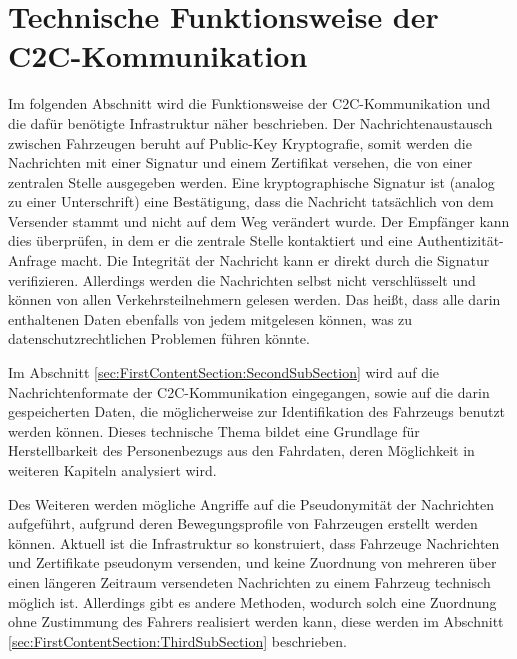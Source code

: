 
\section{Technische  Funktionsweise der C2C-Kommunikation}
\label{ch:FirstContentSection}

Im folgenden Abschnitt wird die Funktionsweise der C2C-Kommunikation und die dafür benötigte Infrastruktur näher beschrieben. Der Nachrichtenaustausch zwischen Fahrzeugen beruht auf Public-Key Kryptografie, somit werden die Nachrichten mit einer Signatur und einem Zertifikat versehen, die von einer zentralen Stelle ausgegeben werden. Eine kryptographische Signatur ist (analog zu einer Unterschrift) eine Bestätigung, dass die Nachricht tatsächlich von dem Versender stammt und nicht auf dem Weg verändert wurde. Der Empfänger kann dies überprüfen, in dem er die zentrale Stelle kontaktiert und eine Authentizität-Anfrage macht. Die Integrität der Nachricht kann er direkt durch die Signatur verifizieren. Allerdings werden die Nachrichten selbst nicht verschlüsselt und können von allen Verkehrsteilnehmern gelesen werden. Das heißt, dass alle darin enthaltenen Daten ebenfalls von jedem mitgelesen können, was zu datenschutzrechtlichen Problemen führen könnte. 

Im Abschnitt \ref{sec:FirstContentSection:SecondSubSection} wird auf die Nachrichtenformate der C2C-Kommunikation eingegangen, sowie auf die darin gespeicherten Daten, die möglicherweise zur Identifikation des Fahrzeugs benutzt werden können. Dieses technische Thema bildet eine Grundlage für Herstellbarkeit des Personenbezugs aus den Fahrdaten, deren Möglichkeit in weiteren Kapiteln analysiert wird.

Des Weiteren werden mögliche Angriffe auf die Pseudonymität der Nachrichten aufgeführt, aufgrund deren Bewegungsprofile von Fahrzeugen erstellt werden können. Aktuell ist die Infrastruktur so konstruiert, dass Fahrzeuge Nachrichten und Zertifikate pseudonym versenden, und keine Zuordnung von mehreren über einen längeren Zeitraum versendeten Nachrichten zu einem Fahrzeug technisch möglich ist. Allerdings gibt es andere Methoden, wodurch solch eine Zuordnung ohne Zustimmung des Fahrers realisiert werden kann, diese werden im Abschnitt \ref{sec:FirstContentSection:ThirdSubSection} beschrieben.

